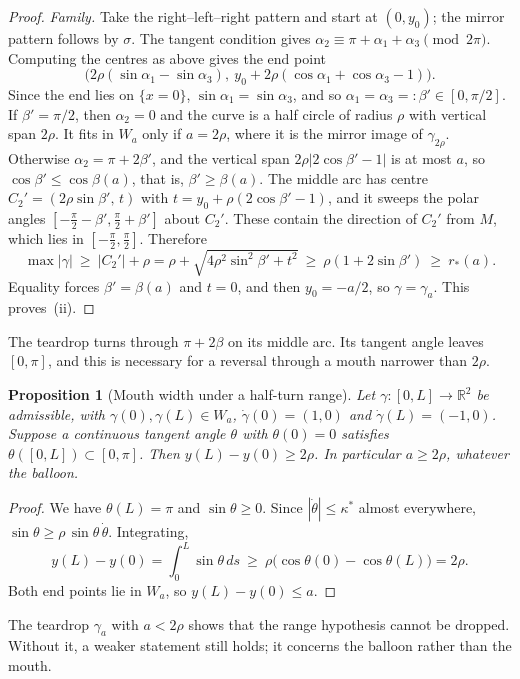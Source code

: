 \documentclass[11pt,reqno]{amsart}
\newtheorem{proposition}[theorem]{Proposition}
\theoremstyle{definition}
\numberwithin{equation}{section}
\begin{document}
\begin{proof}
\emph{Family.} Take the right--left--right pattern and start at $(0,y_0)$; the mirror pattern follows by $\sigma$. The tangent condition gives $\alpha_2\equiv\pi+\alpha_1+\alpha_3\pmod{2\pi}$. Computing the centres as above gives the end point
\[
\bigl(2\rho(\sin\alpha_1-\sin\alpha_3),\ y_0+2\rho(\cos\alpha_1+\cos\alpha_3-1)\bigr).
\]
Since the end lies on $\{x=0\}$, $\sin\alpha_1=\sin\alpha_3$, and so $\alpha_1=\alpha_3=:\beta'\in[0,\pi/2]$. If $\beta'=\pi/2$, then $\alpha_2=0$ and the curve is a half circle of radius $\rho$ with vertical span $2\rho$. It fits in $W_a$ only if $a=2\rho$, where it is the mirror image of $\gamma_{2\rho}$. Otherwise $\alpha_2=\pi+2\beta'$, and the vertical span $2\rho|2\cos\beta'-1|$ is at most $a$, so $\cos\beta'\le\cos\beta(a)$, that is, $\beta'\ge\beta(a)$. The middle arc has centre $C_2'=(2\rho\sin\beta',\,t)$ with $t=y_0+\rho(2\cos\beta'-1)$, and it sweeps the polar angles $[-\tfrac\pi2-\beta',\tfrac\pi2+\beta']$ about $C_2'$. These contain the direction of $C_2'$ from $M$, which lies in $[-\tfrac\pi2,\tfrac\pi2]$. Therefore
\[
\max|\gamma|\ \ge\ |C_2'|+\rho=\rho+\sqrt{4\rho^2\sin^2\beta'+t^2}\ \ge\ \rho(1+2\sin\beta')\ \ge\ r_*(a).
\]
Equality forces $\beta'=\beta(a)$ and $t=0$, and then $y_0=-a/2$, so $\gamma=\gamma_a$. This proves~(ii).
\end{proof}

The teardrop turns through $\pi+2\beta$ on its middle arc. Its tangent angle leaves $[0,\pi]$, and this is necessary for a reversal through a mouth narrower than $2\rho$.

\begin{proposition}[Mouth width under a half-turn range]
\label{prop:mouth_halfturn}
Let $\gamma\colon[0,L]\to\mathbb{R}^2$ be admissible, with $\gamma(0),\gamma(L)\in W_a$, $\dot\gamma(0)=(1,0)$ and $\dot\gamma(L)=(-1,0)$. Suppose a continuous tangent angle $\theta$ with $\theta(0)=0$ satisfies $\theta([0,L])\subset[0,\pi]$. Then $y(L)-y(0)\ge2\rho$. In particular $a\ge2\rho$, whatever the balloon.
\end{proposition}

\begin{proof}
We have $\theta(L)=\pi$ and $\sin\theta\ge0$. Since $|\dot\theta|\le\kappa^*$ almost everywhere, $\sin\theta\ge\rho\,\sin\theta\,\dot\theta$. Integrating,
\[
y(L)-y(0)=\int_0^L\sin\theta\,ds\ \ge\ \rho\bigl(\cos\theta(0)-\cos\theta(L)\bigr)=2\rho.
\]
Both end points lie in $W_a$, so $y(L)-y(0)\le a$.
\end{proof}

The teardrop $\gamma_a$ with $a<2\rho$ shows that the range hypothesis cannot be dropped. Without it, a weaker statement still holds; it concerns the balloon rather than the mouth.
\end{document}
